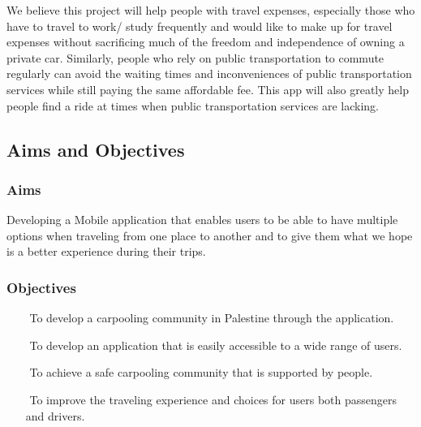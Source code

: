 \documentclass[a4paper, 12pt]{report} %
\begin{document}
        
            We believe this project will help people with travel expenses, especially those who have to travel to work/ study frequently and would like to make up for travel expenses without sacrificing much of the freedom and independence of owning a private car. Similarly, people who rely on public transportation to commute regularly can avoid the waiting times and inconveniences of public transportation services while still paying the same affordable fee. This app will also greatly help people find a ride at times when public transportation services are lacking. 
            
        \subsection{Aims and Objectives}
            \subsubsection{Aims}
                Developing a Mobile application that enables users to be able to have multiple options when traveling from one place to another and to give them what we hope is a better experience during their trips.
                
            \subsubsection{Objectives}
                \begin{itemize}
                    \item [$ $] To develop a carpooling community in Palestine through the application.
                     \item [$ $] To develop an application that is easily accessible to a wide range of users.
                     \item [$ $] To achieve a safe carpooling community that is supported by people.
                     \item [$ $] To improve the traveling experience and choices for users both passengers and drivers.
                \end{itemize}
\end{document}
